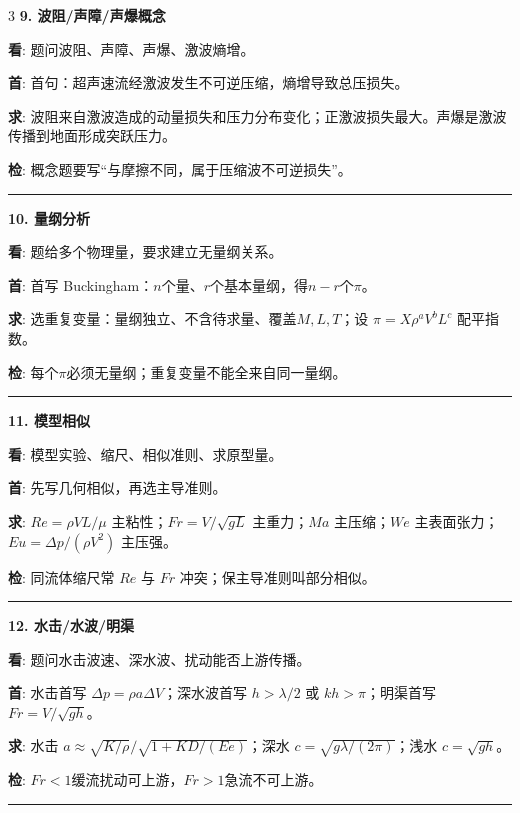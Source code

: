 \documentclass[UTF8,a4paper]{ctexart}
\newcommand{\lab}[1]{\textbf{\textcolor{B}{#1}}}
\newcommand{\blk}[5]{\textbf{\textcolor{B}{#1}}\par
\lab{看}: #2\par
\lab{首}: #3\par
\lab{求}: #4\par
\lab{检}: #5\par\vspace{1pt}\hrule\vspace{1.2pt}}
\begin{document}
\begin{multicols}{3}
\blk{9. 波阻/声障/声爆概念}
{题问波阻、声障、声爆、激波熵增。}
{首句：超声速流经激波发生不可逆压缩，熵增导致总压损失。}
{波阻来自激波造成的动量损失和压力分布变化；正激波损失最大。声爆是激波传播到地面形成突跃压力。}
{概念题要写“与摩擦不同，属于压缩波不可逆损失”。}

\blk{10. 量纲分析}
{题给多个物理量，要求建立无量纲关系。}
{首写 Buckingham：$n$个量、$r$个基本量纲，得$n-r$个$\pi$。}
{选重复变量：量纲独立、不含待求量、覆盖$M,L,T$；设 $\pi=X\rho^aV^bL^c$ 配平指数。}
{每个$\pi$必须无量纲；重复变量不能全来自同一量纲。}

\blk{11. 模型相似}
{模型实验、缩尺、相似准则、求原型量。}
{先写几何相似，再选主导准则。}
{$Re=\rho VL/\mu$ 主粘性；$Fr=V/\sqrt{gL}$ 主重力；$Ma$ 主压缩；$We$ 主表面张力；$Eu=\Delta p/(\rho V^2)$ 主压强。}
{同流体缩尺常 $Re$ 与 $Fr$ 冲突；保主导准则叫部分相似。}

\blk{12. 水击/水波/明渠}
{题问水击波速、深水波、扰动能否上游传播。}
{水击首写 $\Delta p=\rho a\Delta V$；深水波首写 $h>\lambda/2$ 或 $kh>\pi$；明渠首写 $Fr=V/\sqrt{gh}$。}
{水击 $a\approx\sqrt{K/\rho}/\sqrt{1+KD/(Ee)}$；深水 $c=\sqrt{g\lambda/(2\pi)}$；浅水 $c=\sqrt{gh}$。}
{$Fr<1$缓流扰动可上游，$Fr>1$急流不可上游。}

\end{multicols}
\end{document}
